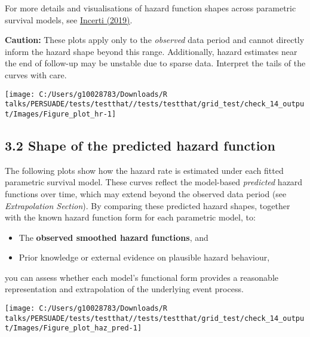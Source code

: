 \documentclass[
]{article}
\providecommand{\tightlist}{%
  \setlength{\itemsep}{0pt}\setlength{\parskip}{0pt}}
\begin{document}
For more details and visualisations of hazard function shapes across
parametric survival models, see
\href{https://devinincerti.com/2019/06/18/parametric_survival.html}{Incerti
(2019)}.

\textbf{Caution:} These plots apply only to the \emph{observed} data
period and cannot directly inform the hazard shape beyond this range.
Additionally, hazard estimates near the end of follow-up may be unstable
due to sparse data. Interpret the tails of the curves with care.

\clearpage

\begin{flushleft}\texttt{[image: C:/Users/g10028783/Downloads/R talks/PERSUADE/tests/testthat//tests/testthat/grid\_test/check\_14\_output/Images/Figure\_plot\_hr-1]} \end{flushleft}

\clearpage

\subsection{3.2 Shape of the predicted hazard
function}\label{shape-of-the-predicted-hazard-function}

The following plots show how the hazard rate is estimated under each
fitted parametric survival model. These curves reflect the model-based
\emph{predicted} hazard functions over time, which may extend beyond the
observed data period (see \emph{Extrapolation Section}). By comparing
these predicted hazard shapes, together with the known hazard function
form for each parametric model, to:

\begin{itemize}
\tightlist
\item
  The \textbf{observed smoothed hazard functions}, and\\
\item
  Prior knowledge or external evidence on plausible hazard behaviour,
\end{itemize}

you can assess whether each model's functional form provides a
reasonable representation and extrapolation of the underlying event
process.

\clearpage

\begin{flushleft}\texttt{[image: C:/Users/g10028783/Downloads/R talks/PERSUADE/tests/testthat//tests/testthat/grid\_test/check\_14\_output/Images/Figure\_plot\_haz\_pred-1]} \end{flushleft}
\end{document}
